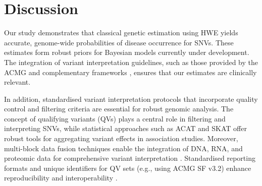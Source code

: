 \documentclass[a4paper,12pt]{article}
\begin{document}
%
%


\section{Discussion}
Our study demonstrates that classical genetic estimation using HWE yields accurate, genome-wide probabilities of disease occurrence for SNVs. These estimates form robust priors for Bayesian models currently under development. The integration of variant interpretation guidelines, such as those provided by the ACMG \citep{richards2015standards} and complementary frameworks \citep{tavtigian2020fitting,li2017intervar}, ensures that our estimates are clinically relevant.

In addition, standardised variant interpretation protocols that incorporate quality control and filtering criteria \citep{pedersen2021effective,anderson2010data} are essential for robust genomic analysis. The concept of qualifying variants (QVs) \citep{cirulli2015exome,tavtigian2020fitting} plays a central role in filtering and interpreting SNVs, while statistical approaches such as ACAT and SKAT \citep{liu2019acat,li2020dynamic,wu2011rare,lee2012optimal} offer robust tools for aggregating variant effects in association studies. Moreover, multi-block data fusion techniques enable the integration of DNA, RNA, and proteomic data for comprehensive variant interpretation \citep{kong2018nature,howe2021within}. Standardised reporting formats and unique identifiers for QV sets (e.g., using ACMG SF v3.2) enhance reproducibility and interoperability \citep{miller2023acmg}.
\end{document}
